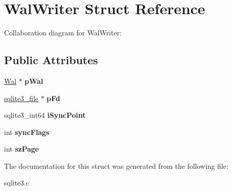 \hypertarget{structWalWriter}{}\section{Wal\+Writer Struct Reference}
\label{structWalWriter}


Collaboration diagram for Wal\+Writer\+:
\subsection*{Public Attributes}
\begin{DoxyCompactItemize}
\item 
\hyperlink{structWal}{Wal} $\ast$ {\bfseries p\+Wal}\hypertarget{structWalWriter_a3ed1cabab4a2f0572ec04d2a174e5bf9}{}\label{structWalWriter_a3ed1cabab4a2f0572ec04d2a174e5bf9}

\item 
\hyperlink{structsqlite3__file}{sqlite3\+\_\+file} $\ast$ {\bfseries p\+Fd}\hypertarget{structWalWriter_a0c98cddd084b97d9f531fa71b92ef40a}{}\label{structWalWriter_a0c98cddd084b97d9f531fa71b92ef40a}

\item 
sqlite3\+\_\+int64 {\bfseries i\+Sync\+Point}\hypertarget{structWalWriter_a1227aea1e12b6b409e8a7cdbae43588e}{}\label{structWalWriter_a1227aea1e12b6b409e8a7cdbae43588e}

\item 
int {\bfseries sync\+Flags}\hypertarget{structWalWriter_acc8dcbdc9b91bae4799b5de113742ae6}{}\label{structWalWriter_acc8dcbdc9b91bae4799b5de113742ae6}

\item 
int {\bfseries sz\+Page}\hypertarget{structWalWriter_aa161832c97830aed52410747ebde5e6e}{}\label{structWalWriter_aa161832c97830aed52410747ebde5e6e}

\end{DoxyCompactItemize}


The documentation for this struct was generated from the following file\+:\begin{DoxyCompactItemize}
\item 
sqlite3.\+c\end{DoxyCompactItemize}
